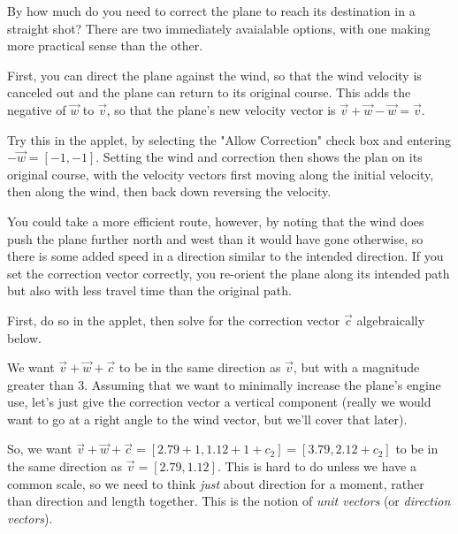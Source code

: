 \documentclass{ximera}
\begin{document}
\begin{example}

  By how much do you need to correct the plane to reach its destination in a straight shot? There are two immediately avaialable options, with one making more practical sense than the other. 

  First, you can direct the plane against the wind, so that the wind velocity is canceled out and the plane can return to its original course. This adds the negative of $\vec{w}$ to $\vec{v}$, so that the plane's new velocity vector is $\vec{v}+\vec{w}-\vec{w}=\vec{v}$.

  Try this in the applet, by selecting the "Allow Correction" check box and entering $-\vec{w}=[-1,-1]$. Setting the wind and correction then shows the plan on its original course, with the velocity vectors first moving along the initial velocity, then along the wind, then back down reversing the velocity. 

  \begin{center}
  \end{center}

  You could take a more efficient route, however, by noting that the wind does push the plane further north and west than it would have gone otherwise, so there is some added speed in a direction similar to the intended direction. If you set the correction vector correctly, you re-orient the plane along its intended path but also with less travel time than the original path.

  First, do so in the applet, then solve for the correction vector $\vec{c}$ algebraically below.

  
  We want $\vec{v}+\vec{w}+\vec{c}$ to be in the same direction as $\vec{v}$, but with a magnitude greater than $3$. Assuming that we want to minimally increase the plane's engine use, let's just give the correction vector a vertical component (really we would want to go at a right angle to the wind vector, but we'll cover that later). 

  So, we want $\vec{v}+\vec{w}+\vec{c}=[2.79+1,1.12+1+c_2]=[3.79,2.12+c_2]$ to be in the same direction as $\vec{v}=[2.79,1.12]$. This is hard to do unless we have a common scale, so we need to think \emph{just} about direction for a moment, rather than direction and length together. This is the notion of \textit{unit vectors} (or \textit{direction vectors}).

  \begin{definition}


\end{definition}
\end{example}
\end{document}
